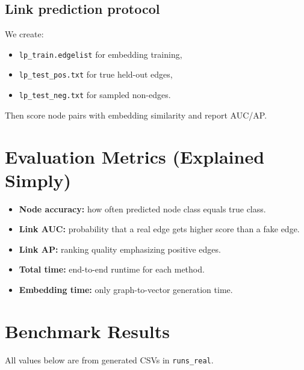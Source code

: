 \documentclass[10pt,twoside,twocolumn]{article}
\begin{document}
\subsection{Link prediction protocol}
We create:
\begin{itemize}
  \item \texttt{lp\_train.edgelist} for embedding training,
  \item \texttt{lp\_test\_pos.txt} for true held-out edges,
  \item \texttt{lp\_test\_neg.txt} for sampled non-edges.
\end{itemize}

Then score node pairs with embedding similarity and report AUC/AP.

\section{Evaluation Metrics (Explained Simply)}
\begin{itemize}
  \item \textbf{Node accuracy:} how often predicted node class equals true class.
  \item \textbf{Link AUC:} probability that a real edge gets higher score than a fake edge.
  \item \textbf{Link AP:} ranking quality emphasizing positive edges.
  \item \textbf{Total time:} end-to-end runtime for each method.
  \item \textbf{Embedding time:} only graph-to-vector generation time.
\end{itemize}

\section{Benchmark Results}
All values below are from generated CSVs in \texttt{runs\_real}.
\end{document}
